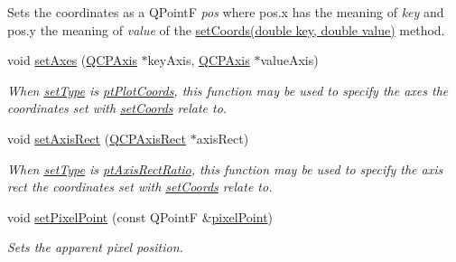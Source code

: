\begin{DoxyCompactItemize}
\begin{DoxyCompactList}
Sets the coordinates as a Q\+Point\+F {\itshape pos} where pos.\+x has the meaning of {\itshape key} and pos.\+y the meaning of {\itshape value} of the \hyperlink{classQCPItemPosition_aa988ba4e87ab684c9021017dcaba945f}{set\+Coords(double key, double value)} method. \end{DoxyCompactList}\item 
void \hyperlink{classQCPItemPosition_a2185f45c75ac8cb9be89daeaaad50e37}{set\+Axes} (\hyperlink{classQCPAxis}{Q\+C\+P\+Axis} $\ast$key\+Axis, \hyperlink{classQCPAxis}{Q\+C\+P\+Axis} $\ast$value\+Axis)
\begin{DoxyCompactList}\small\item\em When \hyperlink{classQCPItemPosition_aa476abf71ed8fa4c537457ebb1a754ad}{set\+Type} is \hyperlink{classQCPItemPosition_aad9936c22bf43e3d358552f6e86dbdc8ad5ffb8dc99ad73263f7010c77342294c}{pt\+Plot\+Coords}, this function may be used to specify the axes the coordinates set with \hyperlink{classQCPItemPosition_aa988ba4e87ab684c9021017dcaba945f}{set\+Coords} relate to. \end{DoxyCompactList}\item 
void \hyperlink{classQCPItemPosition_a0cd9b326fb324710169e92e8ca0041c2}{set\+Axis\+Rect} (\hyperlink{classQCPAxisRect}{Q\+C\+P\+Axis\+Rect} $\ast$axis\+Rect)
\begin{DoxyCompactList}\small\item\em When \hyperlink{classQCPItemPosition_aa476abf71ed8fa4c537457ebb1a754ad}{set\+Type} is \hyperlink{classQCPItemPosition_aad9936c22bf43e3d358552f6e86dbdc8a01080fd00eaf09fa238ef6b73bbfef75}{pt\+Axis\+Rect\+Ratio}, this function may be used to specify the axis rect the coordinates set with \hyperlink{classQCPItemPosition_aa988ba4e87ab684c9021017dcaba945f}{set\+Coords} relate to. \end{DoxyCompactList}\item 
void \hyperlink{classQCPItemPosition_ab404e56d9ac2ac2df0382c57933a71ef}{set\+Pixel\+Point} (const Q\+Point\+F \&\hyperlink{classQCPItemPosition_ae490f9c76ee2ba33752c495d3b6e8fb5}{pixel\+Point})
\begin{DoxyCompactList}\small\item\em Sets the apparent pixel position. \end{DoxyCompactList}\end{DoxyCompactItemize}
